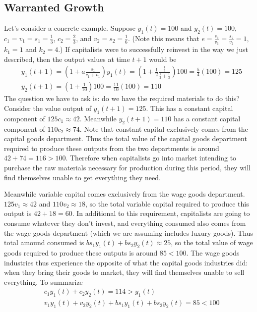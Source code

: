 \documentclass{article}
\theoremstyle{theorem}
\begin{document}
\subsection{Warranted Growth}
 Let's consider a concrete example. Suppose $y_1(t) = 100$ and $y_2(t)=100$, $c_1 = v_1 = s_1 = \frac{1}{3}$, $c_2 = \frac{2}{3}$, and $v_2 = s_2 = \frac{1}{6}$. (Note this means that $e = \frac{s_1}{v_1} = \frac{s_2}{v_2} = 1$, $k_1 = 1$ and $k_2 = 4$.) If capitalists were to successfully reinvest in the way we just described, then the output values at time $t+1$ would be
\begin{align}
	& y_1(t+1) = (1+a\frac{s_1}{c_1+v_1})y_1(t) = \left(1+\frac{1}{2}\frac{\frac{1}{3}}{\frac{1}{3}+\frac{1}{3}}\right)100 = \frac{5}{4}(100) = 125 \\
	& y_2(t+1) = (1+\frac{1}{10})100 = \frac{11}{10}(100) = 110
\end{align}
The question we have to ask is: do we have the required materials to do this? Consider the value output of $y_1(t+1) = 125$. This has a constant capital component of $125c_1 \approx 42$. Meanwhile $y_2(t+1) = 110$ has a constant capital component of $110c_2 \approx 74$. Note that constant capital exclusively comes from the capital goods department. Thus the total value of the capital goods department required to produce these outputs from the two departments is around $42+74 = 116 > 100$. Therefore when capitalists go into market intending to purchase the raw materials necessary for production during this period, they will find themselves unable to get everything they need. \par 
Meanwhile variable capital comes exclusively from the wage goods department. $125v_1 \approx 42$ and $110v_2 \approx 18$, so the total variable capital required to produce this output is $42+18=60$. In additional to this requirement, capitalists are going to consume whatever they don't invest, and everything consumed also comes from the wage goods department (which we are assuming includes luxury goods). Thus total amound consumed is $bs_1y_1(t)+bs_2y_2(t) \approx 25$, so the total value of wage goods required to produce these outputs is around $85 < 100$. The wage goods industries thus experience the opposite of what the capital goods industries did: when they bring their goods to market, they will find themselves unable to sell everything. To summarize
\begin{align}
	& c_1y_1(t) + c_2y_2(t) = 114 > y_1(t) \\
	& v_1y_1(t) + v_2y_2(t) + bs_1y_1(t) + bs_2y_2(t) = 85 < 100
\end{align}
\end{document}
